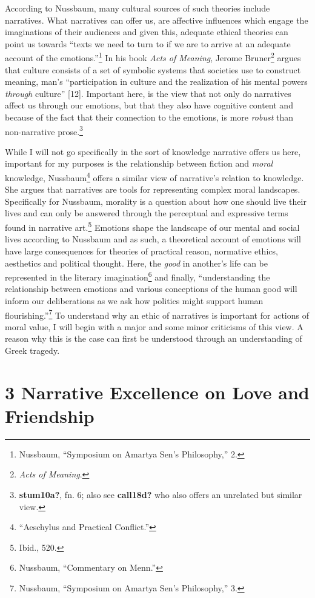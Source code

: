 \documentclass[
  12pt,
]{book}
\theoremstyle{definition}
\theoremstyle{definition}
\theoremstyle{definition}
\theoremstyle{definition}
\theoremstyle{remark}
\begin{document}
According to Nussbaum, many cultural sources of such theories include narratives. What narratives can offer us, are affective influences which engage the imaginations of their audiences and given this, adequate ethical theories can point us towards ``texts we need to turn to if we are to arrive at an adequate account of the emotions.''\footnote{Nussbaum, {``Symposium on {Amartya Sen}'s Philosophy,''} 2.} In his book \emph{Acts of Meaning}, Jerome Bruner\footnote{\emph{Acts of Meaning}.} argues that culture consists of a set of symbolic systems that societies use to construct meaning, man's ``participation in culture and the realization of his mental powers \emph{through} culture'' {[}12{]}. Important here, is the view that not only do narratives affect us through our emotions, but that they also have cognitive content and because of the fact that their connection to the emotions, is more \emph{robust} than non-narrative prose.\footnote{\textbf{stum10a?}, fn. 6; also see \textbf{call18d?} who also offers an unrelated but similar view.}

While I will not go specifically in the sort of knowledge narrative offers us here, important for my purposes is the relationship between fiction and \emph{moral} knowledge, Nussbaum\footnote{{``Aeschylus and Practical Conflict.''}} offers a similar view of narrative's relation to knowledge. She argues that narratives are tools for representing complex moral landscapes. Specifically for Nussbaum, morality is a question about how one should live their lives and can only be answered through the perceptual and expressive terms found in narrative art.\footnote{Ibid., 520.} Emotions shape the landscape of our mental and social lives according to Nussbaum and as such, a theoretical account of emotions will have large consequences for theories of practical reason, normative ethics, aesthetics and political thought. Here, the \emph{good} in another's life can be represented in the literary imagination\footnote{Nussbaum, {``Commentary on {Menn}.''}} and finally, ``understanding the relationship between emotions and various conceptions of the human good will inform our deliberations as we ask how politics might support human flourishing.''\footnote{Nussbaum, {``Symposium on {Amartya Sen}'s Philosophy,''} 3.} To understand why an ethic of narratives is important for actions of moral value, I will begin with a major and some minor criticisms of this view. A reason why this is the case can first be understood through an understanding of Greek tragedy.

\section{3 Narrative Excellence on Love and Friendship}\label{narrative-excellence-on-love-and-friendship}
\end{document}
